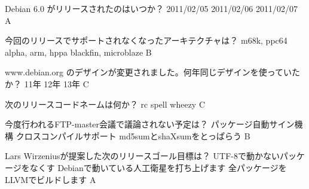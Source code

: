 %

\santaku
{Debian 6.0 がリリースされたのはいつか？}
{2011/02/05}
{2011/02/06}
{2011/02/07}
{A}
{}

\santaku
{今回のリリースでサポートされなくなったアーキテクチャは？}
{m68k, ppc64}
{alpha, arm, hppa}
{blackfin, microblaze}
{B}
{}

\santaku
{www.debian.org のデザインが変更されました。何年同じデザインを使っていたか？}
{11年}
{12年}
{13年}
{C}
{}

\santaku
{次のリリースコードネームは何か？}
{rc}
{spell} %
{wheezy}
{C}
{}

\santaku
{今度行われるFTP-master会議で議論されない予定は？}
{パッケージ自動サイン機構}
{クロスコンパイルサポート}
{md5sumとshaXsumをとっぱらう}
{B}
{}

\santaku
{Lars Wirzeniusが提案した次のリリースゴール目標は？}
{UTF-8で動かないパッケージをなくす}
{Debianで動いている人工衛星を打ち上げます}
{全パッケージをLLVMでビルドします}
{A}
{}
